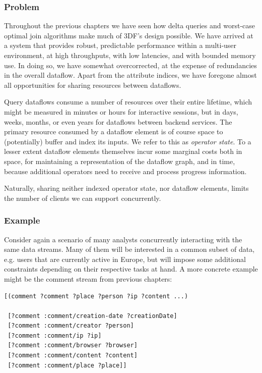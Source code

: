 \documentclass[../catalog.tex]{subfiles}
\begin{document}
\subsubsection{Problem}

Throughout the previous chapters we have seen how delta queries and
worst-case optimal join algorithms make much of 3DF's design
possible. We have arrived at a system that provides robust,
predictable performance within a multi-user environment, at high
throughputs, with low latencies, and with bounded memory use. In doing
so, we have somewhat overcorrected, at the expense of redundancies in
the overall dataflow. Apart from the attribute indices, we have
foregone almost all opportunities for sharing resources between
dataflows.

Query dataflows consume a number of resources over their entire
lifetime, which might be measured in minutes or hours for interactive
sessions, but in days, weeks, months, or even years for dataflows
between backend services. The primary resource consumed by a dataflow
element is of course space to (potentially) buffer and index its
inputs. We refer to this as \emph{operator state}. To a lesser extent
dataflow elements themselves incur some marginal costs both in space,
for maintaining a representation of the dataflow graph, and in time,
because additional operators need to receive and process progress
information.

Naturally, sharing neither indexed operator state, nor dataflow
elements, limits the number of clients we can support concurrently.

\subsubsection{Example}

Consider again a scenario of many analysts concurrently interacting
with the same data streams. Many of them will be interested in a
common subset of data, e.g. users that are currently active in Europe,
but will impose some additional constraints depending on their
respective tasks at hand. A more concrete example might be the comment
stream from previous chapters:

\begin{verbatim}
[(comment ?comment ?place ?person ?ip ?content ...)

 [?comment :comment/creation-date ?creationDate]
 [?comment :comment/creator ?person]
 [?comment :comment/ip ?ip]
 [?comment :comment/browser ?browser]
 [?comment :comment/content ?content]
 [?comment :comment/place ?place]]
\end{verbatim}
\end{document}
